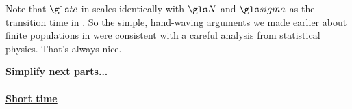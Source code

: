 Note that $\tc$ in  scales identically with $\N$ and $\gsigma$ as the transition time in . So the simple, hand-waving arguments we made earlier about finite populations in \GBM were consistent with a careful analysis from statistical physics. That's always nice.

\textbf{Simplify next parts...}

%
%
%


\paragraph{\underline{Short time}}
\mbox{}

